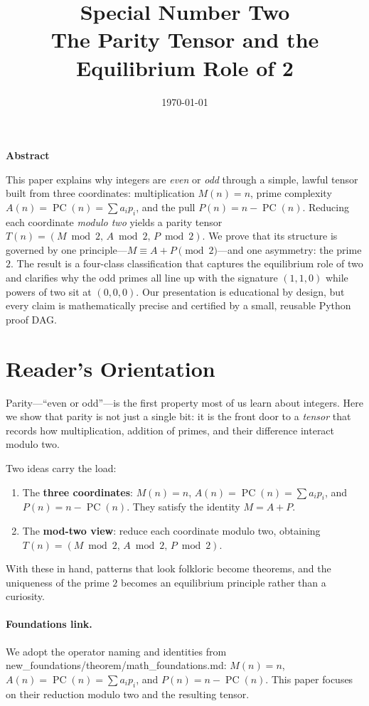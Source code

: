 \documentclass[11pt,a4paper]{article}
\title{Special Number Two\\\large The Parity Tensor and the Equilibrium Role of 2}
\author{}
\date{\today}
\numberwithin{equation}{section}
\numberwithin{figure}{section}
\numberwithin{table}{section}
\theoremstyle{plain}
\theoremstyle{definition}
\theoremstyle{remark}
\DeclareMathOperator{\PC}{PC}  %
\renewenvironment{abstract}{%
  \thispagestyle{empty}%
  \vspace*{0.08\textheight}%
  \begin{center}%
    \begin{minipage}{0.85\textwidth}%
      \centering\bfseries Abstract\par\medskip
}{%
    \end{minipage}%
  \end{center}%
  \vspace*{0.06\textheight}%
  \clearpage%
}
\begin{document}
\maketitle

\begin{abstract}
This paper explains why integers are \emph{even} or \emph{odd} through a simple, lawful tensor built from three coordinates: multiplication \(M(n)=n\), prime complexity \(A(n)=\PC(n)=\sum a_i p_i\), and the pull \(P(n)=n-\PC(n)\). Reducing each coordinate \emph{modulo two} yields a parity tensor \(T(n)=(M\bmod 2,\,A\bmod 2,\,P\bmod 2)\). We prove that its structure is governed by one principle—\(M\equiv A+P\pmod 2\)—and one asymmetry: the prime \(2\). The result is a four-class classification that captures the equilibrium role of two and clarifies why the odd primes all line up with the signature \((1,1,0)\) while powers of two sit at \((0,0,0)\). Our presentation is educational by design, but every claim is mathematically precise and certified by a small, reusable Python proof DAG.
\end{abstract}

\tableofcontents

\section{Reader's Orientation}
Parity—``even or odd''—is the first property most of us learn about integers. Here we show that parity is not just a single bit: it is the front door to a \emph{tensor} that records how multiplication, addition of primes, and their difference interact modulo two.

Two ideas carry the load:
\begin{enumerate}[leftmargin=*]
  \item The \textbf{three coordinates}: \(M(n)=n\), \(A(n)=\PC(n)=\sum a_i p_i\), and \(P(n)=n-\PC(n)\). They satisfy the identity \(M=A+P\).
  \item The \textbf{mod-two view}: reduce each coordinate modulo two, obtaining \(T(n)=(M\bmod 2,\,A\bmod 2,\,P\bmod 2)\).
\end{enumerate}
With these in hand, patterns that look folkloric become theorems, and the uniqueness of the prime \(2\) becomes an equilibrium principle rather than a curiosity.

\paragraph{Foundations link.}
We adopt the operator naming and identities from new\_foundations/theorem/math\_foundations.md: \(M(n)=n\), \(A(n)=\PC(n)=\sum a_i p_i\), and \(P(n)=n-\PC(n)\). This paper focuses on their reduction modulo two and the resulting tensor.
\end{document}
